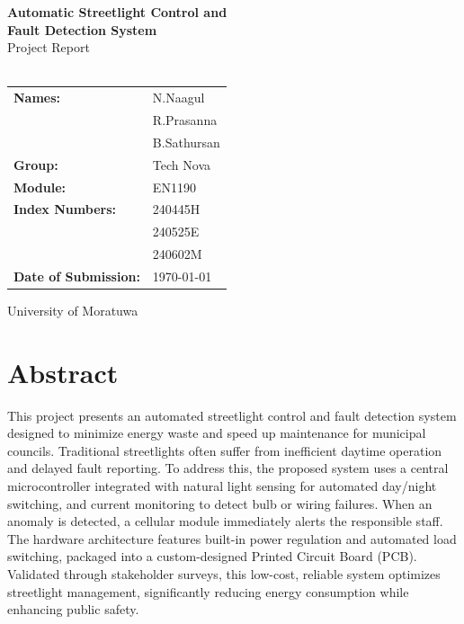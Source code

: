 \documentclass[12pt,a4paper]{article}
\begin{document}
\begin{titlepage}
    \centering
    \vspace*{1cm}

    {\LARGE \textbf{Automatic Streetlight Control and\\[0.3cm] Fault Detection System}}\\[0.5cm]
    {\large Project Report}\\[1.5cm]

    \\[1.2cm]

    \begin{tabular}{ll}
        \textbf{Names:} & N.Naagul \\
                        & R.Prasanna \\
                        & B.Sathursan \\[0.4cm]
                        
        \textbf{Group:} & Tech Nova \\[0.2cm]
        \textbf{Module:} & EN1190 \\[0.2cm]
        \textbf{Index Numbers:} & 240445H \\
                                & 240525E \\
                                & 240602M \\[0.4cm]
                                
        \textbf{Date of Submission:} & \today \\
    \end{tabular}

    \vfill
    {\small University of Moratuwa}
\end{titlepage}

\newpage
{}
\section*{Abstract}

This project presents an automated streetlight control and fault detection system designed to minimize energy waste and speed up maintenance for municipal councils. Traditional streetlights often suffer from inefficient daytime operation and delayed fault reporting. To address this, the proposed system uses a central microcontroller integrated with natural light sensing for automated day/night switching, and current monitoring to detect bulb or wiring failures. When an anomaly is detected, a cellular module immediately alerts the responsible staff. The hardware architecture features built-in power regulation and automated load switching, packaged into a custom-designed Printed Circuit Board (PCB). Validated through stakeholder surveys, this low-cost, reliable system optimizes streetlight management, significantly reducing energy consumption while enhancing public safety.
\end{document}
